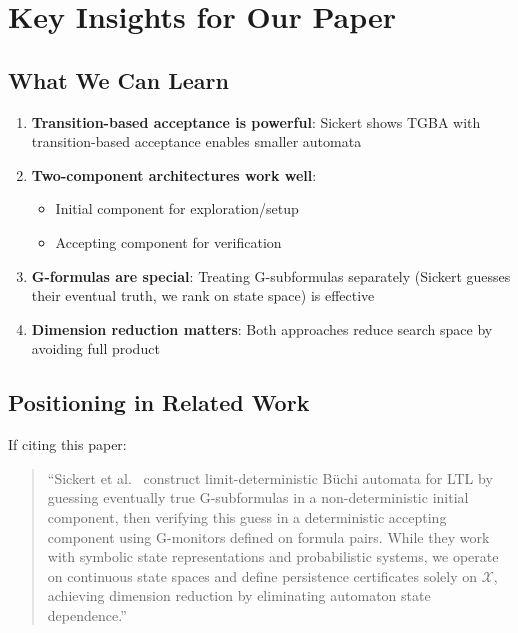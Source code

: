 \documentclass{article}
\begin{document}
\section{Key Insights for Our Paper}

\subsection{What We Can Learn}

\begin{enumerate}
    \item \textbf{Transition-based acceptance is powerful}: Sickert shows TGBA with transition-based acceptance enables smaller automata

    \item \textbf{Two-component architectures work well}:
    \begin{itemize}
        \item Initial component for exploration/setup
        \item Accepting component for verification
    \end{itemize}

    \item \textbf{G-formulas are special}: Treating G-subformulas separately (Sickert guesses their eventual truth, we rank on state space) is effective

    \item \textbf{Dimension reduction matters}: Both approaches reduce search space by avoiding full product
\end{enumerate}

\subsection{Positioning in Related Work}

If citing this paper:

\begin{quote}
``Sickert et al.~\cite{sickert2016limit} construct limit-deterministic Büchi automata for LTL by guessing eventually true G-subformulas in a non-deterministic initial component, then verifying this guess in a deterministic accepting component using G-monitors defined on formula pairs. While they work with symbolic state representations and probabilistic systems, we operate on continuous state spaces and define persistence certificates solely on $\mathcal{X}$, achieving dimension reduction by eliminating automaton state dependence.''
\end{quote}
\end{document}
